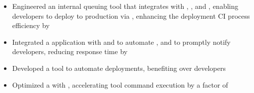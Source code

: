 {\begin{rSection}{}
 \href{https://www.wonolo.com/}{}  \hfill {}
\begin{itemize}
    \itemsep -4pt {} 
    \item Engineered an internal queuing tool that integrates with , , and , enabling developers to deploy to production via , enhancing the deployment CI process efficiency by 
    \item Integrated a  application with  and  to automate , and  to promptly notify developers, reducing response time by 
    \item Developed a  tool to automate  deployments, benefiting over  developers
    \item Optimized a  with , accelerating tool command execution by a factor of 
\end{itemize}


\end{rSection}}
